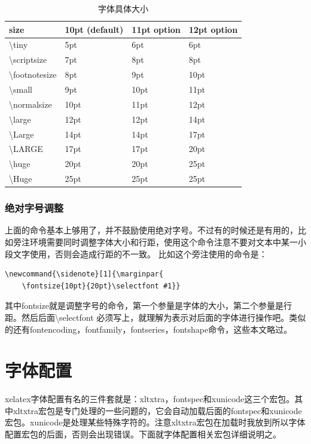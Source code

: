 \documentclass[12pt,oneside]{book}
\begin{document}
\begin{common-format}
\begin{table}[H]
\centering
\begin{tabular}{@{}llll@{}}
\toprule 
size          & 10pt (default) & 11pt option & 12pt option \\ \midrule
\textbackslash tiny         & 5pt            & 6pt         & 6pt         \\
\textbackslash scriptsize   & 7pt            & 8pt         & 8pt         \\
\textbackslash footnotesize & 8pt            & 9pt         & 10pt        \\
\textbackslash small        & 9pt            & 10pt        & 11pt        \\
\textbackslash normalsize   & 10pt           & 11pt        & 12pt        \\
\textbackslash large        & 12pt           & 12pt        & 14pt        \\
\textbackslash Large        & 14pt           & 14pt        & 17pt        \\
\textbackslash LARGE        & 17pt           & 17pt        & 20pt        \\
\textbackslash huge         & 20pt           & 20pt        & 25pt        \\
\textbackslash Huge         & 25pt           & 25pt        & 25pt        \\ \bottomrule
\end{tabular}
\label{tab:字体具体大小}
\caption{字体具体大小}
\end{table}


\subsubsection{绝对字号调整}
上面的命令基本上够用了，并不鼓励使用绝对字号。不过有的时候还是有用的，比如旁注环境需要同时调整字体大小和行距，使用这个命令注意不要对文本中某一小段文字使用，否则会造成行距的不一致。
比如这个旁注使用的命令是：
\begin{Verbatim}
\newcommand{\sidenote}[1]{\marginpar{  
 	\fontsize{10pt}{20pt}\selectfont #1}}
\end{Verbatim}
其中fontsize就是调整字号的命令，第一个参量是字体的大小，第二个参量是行距。然后后面\textbackslash selectfont 必须写上，就理解为表示对后面的字体进行操作吧。类似的还有fontencoding，fontfamily，fontseries，fontshape命令，这些本文略过。


\section{字体配置}
xelatex字体配置有名的三件套就是：xltxtra，fontspec和xunicode这三个宏包。其中xltxtra宏包是专门处理\XeLaTeX 的一些问题的，它会自动加载后面的fontspec和xunicode宏包。xunicode是处理某些特殊字符的。注意xltxtra宏包在加载时我放到所以字体配置宏包的后面，否则会出现错误。下面就字体配置相关宏包详细说明之。



\end{common-format}
\end{document}
